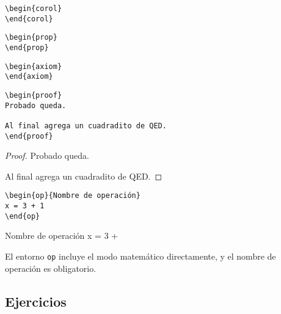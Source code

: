 \documentclass[nochap]{apuntes}
\begin{document}
\begin{verbatim}
\begin{corol}
\end{corol}
\end{verbatim}

\begin{corol}
\end{corol}

\begin{verbatim}
\begin{prop}
\end{prop}
\end{verbatim}

\begin{prop}
\end{prop}

\begin{verbatim}
\begin{axiom}
\end{axiom}
\end{verbatim}

\begin{axiom}
\end{axiom}

\begin{verbatim}
\begin{proof}
Probado queda.

Al final agrega un cuadradito de QED.
\end{proof}
\end{verbatim}

\begin{proof}
Probado queda. 

Al final agrega un cuadradito de QED.
\end{proof}

\begin{verbatim}
\begin{op}{Nombre de operación}
x = 3 + 1
\end{op}
\end{verbatim}

\begin{op}{Nombre de operación}
x = 3 +  
\end{op}

El entorno \texttt{op} incluye el modo matemático directamente, y el nombre de operación es obligatorio.

\subsection{Ejercicios}
\end{document}
